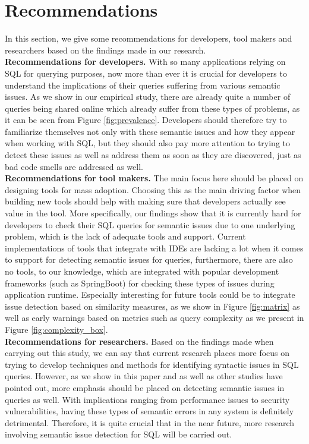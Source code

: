 \section{Recommendations}

In this section, we give some recommendations for developers, tool makers and researchers based on the findings made in our research.\\

\noindent \textbf{Recommendations for developers.} With so many applications relying on SQL for querying purposes, now more than ever it is crucial for developers to understand the implications of their queries suffering from various semantic issues. As we show in our empirical study, there are already quite a number of queries being shared online which already suffer from these types of problems, as it can be seen from Figure \ref{fig:prevalence}. Developers should therefore try to familiarize themselves not only with these semantic issues and how they appear when working with SQL, but they should also pay more attention to trying to detect these issues as well as address them as soon as they are discovered, just as bad code smells are addressed as well.\\

\noindent \textbf{Recommendations for tool makers.} The main focus here should be placed on designing tools for mass adoption. Choosing this as the main driving factor when building new tools should help with making sure that developers actually see value in the tool. More specifically, our findings show that it is currently hard for developers to check their SQL queries for semantic issues due to one underlying problem, which is the lack of adequate tools and support. Current implementations of tools that integrate with IDEs are lacking a lot when it comes to support for detecting semantic issues for queries, furthermore, there are also no tools, to our knowledge, which are integrated with popular development frameworks (such as SpringBoot) for checking these types of issues during application runtime. Especially interesting for future tools could be to integrate issue detection based on similarity measures, as we show in Figure \ref{fig:matrix} as well as early warnings based on metrics such as query complexity as we present in Figure \ref{fig:complexity_box}.\\

\noindent \textbf{Recommendations for researchers.} Based on the findings made when carrying out this study, we can say that current research places more focus on trying to develop techniques and methods for identifying syntactic issues in SQL queries. However, as we show in this paper and as well as other studies have pointed out, more emphasis should be placed on detecting semantic issues in queries as well. With implications ranging from performance issues to security vulnerabilities, having these types of semantic errors in any system is definitely detrimental. Therefore, it is quite crucial that in the near future, more research involving semantic issue detection for SQL will be carried out.


